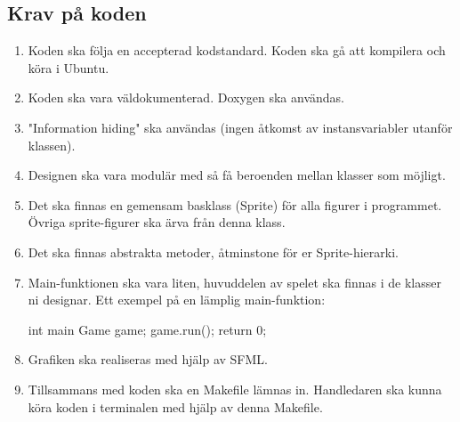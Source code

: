 \documentclass{TDP005mall}
\begin{document}
\subsection{Krav på koden}
\begin{enumerate}
\item    Koden ska följa en accepterad kodstandard. Koden ska gå att kompilera och köra i Ubuntu.
\item    Koden ska vara väldokumenterad. Doxygen ska användas.
\item    "Information hiding" ska användas (ingen åtkomst av instansvariabler utanför klassen).
\item    Designen ska vara modulär med så få beroenden mellan klasser som möjligt.
\item    Det ska finnas en gemensam basklass (Sprite) för alla figurer i programmet. Övriga sprite-figurer ska ärva från denna klass.
\item    Det ska finnas abstrakta metoder, åtminstone för er Sprite-hierarki.
\item    Main-funktionen ska vara liten, huvuddelen av spelet ska finnas i de klasser ni designar. Ett exempel på en lämplig main-funktion:

    int main {
       Game game;
       game.run();
       return 0;
    }
        

\item    Grafiken ska realiseras med hjälp av SFML.
\item    Tillsammans med koden ska en Makefile lämnas in. Handledaren ska kunna köra koden i terminalen med hjälp av denna Makefile.
\end{enumerate}
\end{document}
